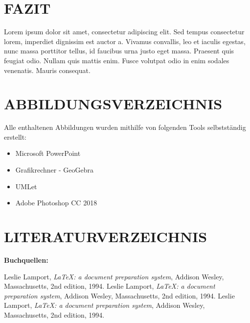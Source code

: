 \documentclass[a4paper,12pt]{article}
\begin{document}
\newpage
\section{FAZIT}



Lorem ipsum dolor sit amet, consectetur adipiscing elit. Sed tempus consectetur lorem, imperdiet dignissim est auctor a. Vivamus convallis, leo et iaculis egestas, nunc massa porttitor tellus, id faucibus urna justo eget massa. Praesent quis feugiat odio. Nullam quis mattis enim. Fusce volutpat odio in enim sodales venenatis. Mauris consequat.


\newpage
\section{ABBILDUNGSVERZEICHNIS}
Alle enthaltenen Abbildungen wurden mithilfe von folgenden Tools selbstständig erstellt:
\begin{itemize}
\item Microsoft PowerPoint
\item Grafikrechner - GeoGebra
\item UMLet
\item Adobe Photoshop CC 2018 
\end{itemize}


\newpage
\section{LITERATURVERZEICHNIS}

\begingroup
\renewcommand{\section}[2]{}%
\begin{large}
\textbf{Buchquellen:}
\end{large}

\begin{thebibliography}{9}

      Leslie Lamport,
      \textit{\LaTeX: a document preparation system},
      Addison Wesley, Massachusetts,
      2nd edition,
      1994.
      Leslie Lamport,
      \textit{\LaTeX: a document preparation system},
      Addison Wesley, Massachusetts,
      2nd edition,
      1994.
      Leslie Lamport,
      \textit{\LaTeX: a document preparation system},
      Addison Wesley, Massachusetts,
      2nd edition,
      1994.

\end{thebibliography}
\end{document}

